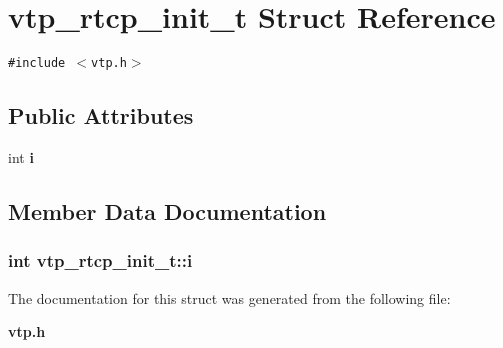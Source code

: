 \section{vtp\_\-rtcp\_\-init\_\-t Struct Reference}
\label{structvtp__rtcp__init__t}
{\tt \#include $<$vtp.h$>$}

\subsection*{Public Attributes}
\begin{CompactItemize}
\item 
int {\bf i}
\end{CompactItemize}


\subsection{Member Data Documentation}
\subsubsection{\setlength{\rightskip}{0pt plus 5cm}int {\bf vtp\_\-rtcp\_\-init\_\-t::i}}\label{structvtp__rtcp__init__t_o0}




The documentation for this struct was generated from the following file:\begin{CompactItemize}
\item 
{\bf vtp.h}\end{CompactItemize}
